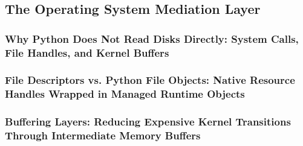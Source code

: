 \subsection{The Operating System Mediation Layer}
\subsubsection{Why Python Does Not Read Disks Directly: System Calls, File Handles, and Kernel Buffers}
\subsubsection{File Descriptors vs. Python File Objects: Native Resource Handles Wrapped in Managed Runtime Objects}
\subsubsection{Buffering Layers: Reducing Expensive Kernel Transitions Through Intermediate Memory Buffers}

